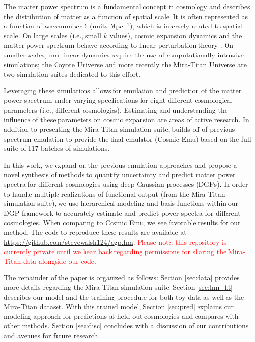 \documentclass[11pt]{article}
\begin{document}
The matter power spectrum is a fundamental concept in cosmology and describes the distribution of matter as a function of spatial scale. It is often represented as a function of wavenumber $k$ (units Mpc$^{-1}$), which is inversely related to spatial scale. On large scales (i.e., small $k$ values), cosmic expansion dynamics and the matter power spectrum behave according to linear perturbation theory \citep{pietroni2008flowing, lesgourgues2009non}. On smaller scales, non-linear dynamics require the use of computationally intensive simulations; the Coyote Universe \citep{lawrence2010coyote} and more recently the Mira-Titan Universe \citep{moran2023mira} are two simulation suites dedicated to this effort. 

Leveraging these simulations allows for emulation and prediction of the matter power spectrum under varying specifications for eight different cosmological parameters (i.e., different cosmologies). Estimating and understanding the influence of these parameters on cosmic expansion are areas of active research. In addition to presenting the Mira-Titan simulation suite, \cite{moran2023mira} builds off of previous spectrum emulation \citep{lawrence2017mira} to provide the final emulator (Cosmic Emu) based on the full suite of 117 batches of simulations. 

In this work, we expand on the previous emulation approaches and propose a novel synthesis of methods to quantify uncertainty and predict matter power spectra for different cosmologies using deep Gaussian processes (DGPs). In order to handle multiple realizations of functional output (from the Mira-Titan simulation suite), we use hierarchical modeling and basis functions within our DGP framework to accurately estimate and predict power spectra for different cosmologies. When comparing to Cosmic Emu, we see favorable results for our method. The code to reproduce these results are available at \url{https://github.com/stevewalsh124/dgp.hm}. \textcolor{red}{Please note: this repository is currently private until we hear back regarding permissions for sharing the Mira-Titan data alongside our code.}

The remainder of the paper is organized as follows: Section \ref{sec:data} provides more details regarding the Mira-Titan simulation suite. Section \ref{sec:hm_fit} describes our model and the training procedure for both toy data as well as the Mira-Titan dataset. With this trained model, Section \ref{sec:pred} explains our modeling approach for predictions at held-out cosmologies and compares with other methods. Section \ref{sec:disc} concludes with a discussion of our contributions and avenues for future research.
\end{document}

